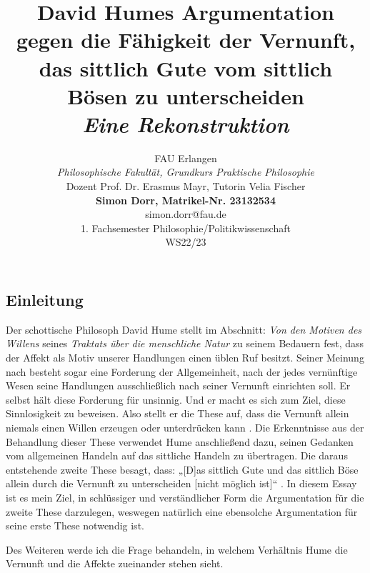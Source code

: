 \documentclass[ngerman,12pt]{diazessay} %
\title{\textbf{David Humes Argumentation gegen die Fähigkeit der Vernunft, das sittlich Gute vom sittlich Bösen zu unterscheiden} \\
\vspace{3em}
{\Large\itshape Eine Rekonstruktion \vspace{4em}}} %
\author{
FAU Erlangen \\
\textit{Philosophische Fakultät, Grundkurs Praktische Philosophie} \\
Dozent Prof. Dr. Erasmus Mayr, Tutorin Velia Fischer \\
\textbf{Simon Dorr, Matrikel-Nr. 23132534} \\
simon.dorr@fau.de \\
1. Fachsemester Philosophie/Politikwissenschaft \\
WS22/23
} %
\begin{document}
\begin{doublespace}
\maketitle %
\newpage


\tableofcontents
\newpage

\section{Einleitung}

Der schottische Philosoph David Hume stellt im Abschnitt: \textit{Von den Motiven des Willens} seines \textit{Traktats über die menschliche Natur} zu seinem Bedauern fest, dass der Affekt als Motiv unserer Handlungen einen üblen Ruf besitzt. Seiner Meinung nach besteht sogar eine Forderung der Allgemeinheit, nach der jedes vernünftige Wesen seine Handlungen ausschließlich nach seiner Vernunft einrichten soll. Er selbst hält diese Forderung für unsinnig. Und er macht es sich zum Ziel, diese Sinnlosigkeit zu beweisen. Also stellt er die These auf, dass die Vernunft allein niemals einen Willen erzeugen oder unterdrücken kann \cite[siehe S.484]{Hume.2013}. Die Erkenntnisse aus der Behandlung dieser These verwendet Hume anschließend dazu, seinen Gedanken vom allgemeinen Handeln auf das sittliche Handeln zu übertragen. Die daraus entstehende zweite These besagt, dass: „[D]as sittlich Gute und das sittlich Böse allein durch die Vernunft zu unterscheiden [nicht möglich ist]“ \cite[S.433]{Hume.2013}. In diesem Essay ist es mein Ziel, in schlüssiger und verständlicher Form die Argumentation für die zweite These darzulegen, weswegen natürlich eine ebensolche Argumentation für seine erste These notwendig ist.
\par\bigskip   
Des Weiteren werde ich die Frage behandeln, in welchem Verhältnis Hume die Vernunft und die Affekte zueinander stehen sieht.


\end{doublespace}
\end{document}

